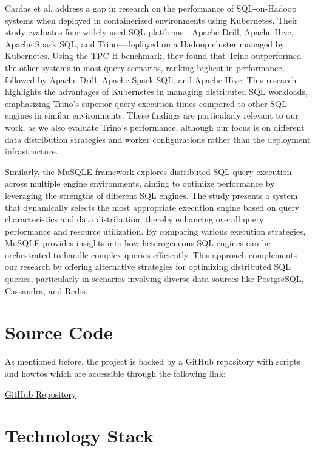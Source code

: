 \documentclass[conference]{IEEEtran}
\begin{document}
Cardas et al. \cite{b9} address a gap in research on the performance of SQL-on-Hadoop systems
when deployed in containerized environments using Kubernetes. Their study evaluates four
widely-used SQL platforms—Apache Drill, Apache Hive, Apache Spark SQL, and Trino—deployed
on a Hadoop cluster managed by Kubernetes. Using the TPC-H benchmark, they found that Trino
outperformed the other systems in most query scenarios, ranking highest in performance, followed
by Apache Drill, Apache Spark SQL, and Apache Hive. This research highlights the advantages of
Kubernetes in managing distributed SQL workloads, emphasizing Trino’s superior query execution
times compared to other SQL engines in similar environments. These findings are particularly
relevant to our work, as we also evaluate Trino's performance, although our focus is on different
data distribution strategies and worker configurations rather than the deployment infrastructure.

Similarly, the MuSQLE framework \cite{b10} explores distributed SQL query execution across multiple
engine environments, aiming to optimize performance by leveraging the strengths of different SQL
engines. The study presents a system that dynamically selects the most appropriate execution engine
based on query characteristics and data distribution, thereby enhancing overall query performance
and resource utilization. By comparing various execution strategies, MuSQLE provides insights into
how heterogeneous SQL engines can be orchestrated to handle complex queries efficiently. This approach
complements our research by offering alternative strategies for optimizing distributed SQL queries,
particularly in scenarios involving diverse data sources like PostgreSQL, Cassandra, and Redis.

\section{Source Code}
As mentioned before, the project is backed by a GitHub repository with scripts and howtos which are accessible
through the following link:

\begin{center}
	\textcolor{linkblue}{\underline{\href{https://github.com/alex1on/Information-Systems-NTUA}{GitHub Repository}}}
\end{center}

\section{Technology Stack}
\end{document}
